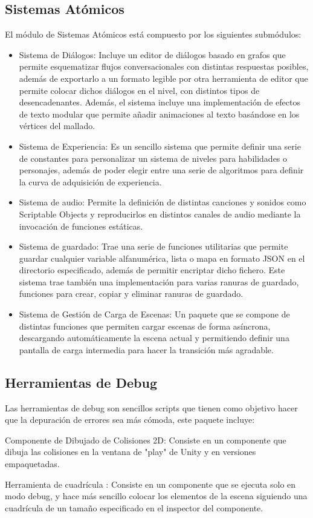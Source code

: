 \subsection{Sistemas Atómicos}
El módulo de Sistemas Atómicos está compuesto por los siguientes submódulos:
\begin{itemize}
  \item Sistema de Diálogos: Incluye un editor de diálogos basado en grafos que permite esquematizar flujos conversacionales con distintas respuestas posibles, 
  además de exportarlo a un formato legible por otra herramienta de editor que permite colocar dichos diálogos en el nivel, con distintos tipos de desencadenantes. Además, 
  el sistema incluye una implementación de efectos de texto modular que permite añadir animaciones al texto basándose en los vértices del mallado. 
  \item Sistema de Experiencia: Es un sencillo sistema que permite definir una serie de constantes para personalizar un sistema de niveles para habilidades o personajes,
   además de poder elegir entre una serie de algoritmos para definir la curva de adquisición de experiencia. 
  \item Sistema de audio: Permite la definición de distintas canciones y sonidos como Scriptable Objects y reproducirlos en distintos canales de audio 
   mediante la invocación de funciones estáticas.
  \item Sistema de guardado: Trae una serie de funciones utilitarias que permite guardar cualquier variable alfanumérica, lista o mapa en formato JSON en el directorio 
   especificado, además de permitir encriptar dicho fichero. Este sistema trae también una implementación para varias ranuras de guardado, funciones para crear, copiar y
   eliminar ranuras de guardado.
  \item Sistema de Gestión de Carga de Escenas: Un paquete que se compone de distintas funciones que permiten cargar escenas de forma asíncrona, descargando automáticamente 
   la escena actual y permitiendo definir una pantalla de carga intermedia para hacer la transición más agradable.
\end{itemize}

\subsection{Herramientas de Debug}
Las herramientas de debug son sencillos scripts que tienen como objetivo hacer que la depuración de errores sea más cómoda, este paquete incluye:
\begin{compactitem}
  \item Componente de Dibujado de Colisiones 2D: Consiste en un componente que dibuja las colisiones en la ventana de "play" de Unity y en versiones empaquetadas.   
  \item Herramienta de cuadrícula : Consiste en un componente que se ejecuta solo en modo debug, y hace más sencillo colocar los elementos de la escena siguiendo una
   cuadrícula de un tamaño especificado en el inspector del componente. 
\end{compactitem} 

